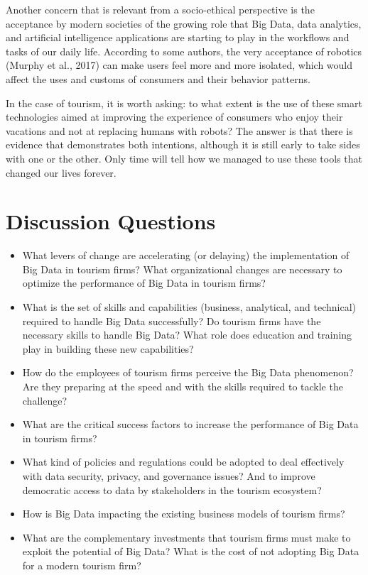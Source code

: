 \documentclass[
  letterpaper,
  DIV=11,
  numbers=noendperiod]{scrreprt}
\begin{document}
Another concern that is relevant from a socio-ethical perspective is the
acceptance by modern societies of the growing role that Big Data, data
analytics, and artificial intelligence applications are starting to play
in the workflows and tasks of our daily life. According to some authors,
the very acceptance of robotics (Murphy et al., 2017) can make users
feel more and more isolated, which would affect the uses and customs of
consumers and their behavior patterns.

In the case of tourism, it is worth asking: to what extent is the use of
these smart technologies aimed at improving the experience of consumers
who enjoy their vacations and not at replacing humans with robots? The
answer is that there is evidence that demonstrates both intentions,
although it is still early to take sides with one or the other. Only
time will tell how we managed to use these tools that changed our lives
forever.

\hypertarget{discussion-questions-5}{%
\section{Discussion Questions}\label{discussion-questions-5}}

\begin{itemize}
\item
  What levers of change are accelerating (or delaying) the
  implementation of Big Data in tourism firms? What organizational
  changes are necessary to optimize the performance of Big Data in
  tourism firms?
\item
  What is the set of skills and capabilities (business, analytical, and
  technical) required to handle Big Data successfully? Do tourism firms
  have the necessary skills to handle Big Data? What role does education
  and training play in building these new capabilities?
\item
  How do the employees of tourism firms perceive the Big Data
  phenomenon? Are they preparing at the speed and with the skills
  required to tackle the challenge?
\item
  What are the critical success factors to increase the performance of
  Big Data in tourism firms?
\item
  What kind of policies and regulations could be adopted to deal
  effectively with data security, privacy, and governance issues? And to
  improve democratic access to data by stakeholders in the tourism
  ecosystem?
\item
  How is Big Data impacting the existing business models of tourism
  firms?
\item
  What are the complementary investments that tourism firms must make to
  exploit the potential of Big Data? What is the cost of not adopting
  Big Data for a modern tourism firm?
\end{itemize}
\end{document}
